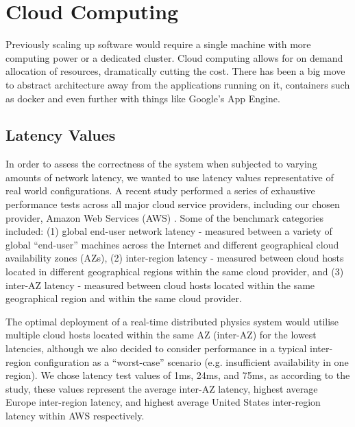 \section{Cloud Computing}

Previously scaling up software would require a single machine with more computing power or a dedicated cluster. Cloud computing allows for on demand allocation of resources, dramatically cutting the cost. There has been a big move to abstract architecture away from the applications running on it, containers such as docker and even further with things like Google's App Engine.


\subsection{Latency Values}

In order to assess the correctness of the system when subjected to varying amounts of network latency, we wanted to use latency values representative of real world configurations. A recent study performed a series of exhaustive performance tests across all major cloud service providers, including our chosen provider, Amazon Web Services (AWS) \cite{ThousandEyesCloudPerf2019}. Some of the benchmark categories included: (1) global end-user network latency - measured between a variety of global ``end-user'' machines across the Internet and different geographical cloud availability zones (AZs), (2) inter-region latency - measured between cloud hosts located in different geographical regions within the same cloud provider, and (3) inter-AZ latency - measured between cloud hosts located within the same geographical region and within the same cloud provider.

The optimal deployment of a real-time distributed physics system would utilise multiple cloud hosts located within the same AZ (inter-AZ) for the lowest latencies, although we also decided to consider performance in a typical inter-region configuration as a ``worst-case'' scenario (e.g. insufficient availability in one region). We chose latency test values of 1ms, 24ms, and 75ms, as according to the study, these values represent the average inter-AZ latency, highest average Europe inter-region latency, and highest average United States inter-region latency within AWS respectively.

